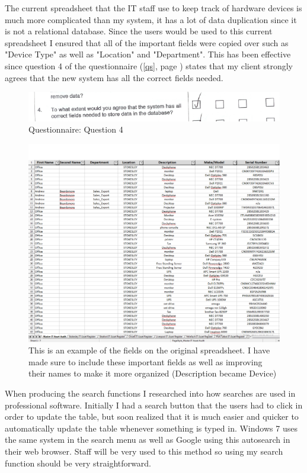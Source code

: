 The current spreadsheet that the IT staff use to keep track of hardware devices is much more complicated than my system, it has a lot of data duplication since it is not a relational database. Since the users would be used to this current spreadsheet I ensured that all of the important fields were copied over such as "Device Type" as well as "Location" and "Department". This has been effective since question 4 of the questionnaire (\ref{qs}, page \pageref{qs}) states that my client strongly agrees that the new system has all the correct fields needed.

\begin{figure}[H]
    \includegraphics[width=\textwidth]{./Evaluation/EvaluationQuestionnaire/4.png}
    \caption{Questionnaire: Question 4} 
\end{figure}

\begin{figure}[H]
    \includegraphics[width=\textwidth]{./Evaluation/Images/spreadsheet.png}
    \caption{This is an example of the fields on the original spreadsheet. I have made sure to include these important fields as well as improving their names to make it more organized (Description became Device)} 
\end{figure}

When producing the search functions I researched into how searches are used in professional software. Initially I had a search button that the users had to click in order to update the table, but soon realized that it is much easier and quicker to automatically update the table whenever something is typed in. Windows 7 uses the same system in the search menu as well as Google using this autosearch in their web browser. Staff will be very used to this method so using my search function should be very straightforward.


